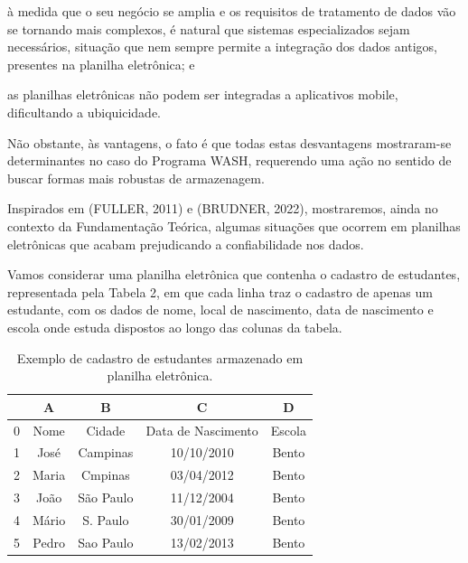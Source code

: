 \documentclass[
12pt,		%
openright,	%
twoside,  %
a4paper,			%
chapter=TITLE,		%
english,			%
french,				%
spanish,			%
brazil				%
]{USPSC-classe/USPSC}
\begin{document}
\begin{alineas}
\item \`a medida que o seu \textquotedbl  neg\'ocio \textquotedbl  se amplia e os requisitos de tratamento de dados v\~ao se tornando mais complexos, \'e natural que sistemas especializados sejam necess\'arios, situa\c{c}\~ao que nem sempre permite a integra\c{c}\~ao dos dados antigos, presentes na planilha eletr\^onica; e
\item as planilhas eletr\^onicas n\~ao podem ser integradas a aplicativos mobile, dificultando a ubiquicidade.
\end{alineas}

N\~ao obstante, \`as vantagens, o fato \'e que todas estas desvantagens mostraram-se determinantes no caso do Programa WASH, requerendo uma a\c{c}\~ao no sentido de buscar formas mais robustas de armazenagem.









Inspirados em (FULLER, 2011) e (BRUDNER, 2022), mostraremos, ainda no contexto da Fundamenta\c{c}\~ao Te\'orica, algumas situa\c{c}\~oes que ocorrem em planilhas eletr\^onicas que acabam prejudicando a confiabilidade nos dados.









Vamos considerar uma planilha  eletr\^onica que contenha o cadastro de estudantes, representada pela Tabela 2, em que cada linha traz o cadastro de apenas um estudante, com os dados de nome, local de nascimento, data de nascimento e escola onde estuda dispostos ao longo das colunas da tabela.













\begin{table}[htb]
\tiny
\caption{\label{ddd7a335bbc10f88eaaf4abda266d151f0ba0e6f}Exemplo de cadastro de estudantes armazenado em planilha eletr\^onica.}

\centering
\begin{tabular}{|c|c|c|c|c|}
\hline
  &  A  &  B  &  C  &  D  \\
\hline
0 & Nome  &  Cidade  &  Data de Nascimento  &  Escola \\
1 & Jos\'e  &  Campinas  &  10/10/2010  &  Bento \\
2 & Maria  &  Cmpinas  &  03/04/2012  &  Bento \\
3 & Jo\~ao  &  S\~ao Paulo  &  11/12/2004  &  Bento \\
4 & M\'ario  &  S. Paulo  &  30/01/2009  &  Bento \\
5 & Pedro  &  Sao Paulo  &  13/02/2013  &  Bento \\
\hline
\end{tabular}
\end{table}
\end{document}
